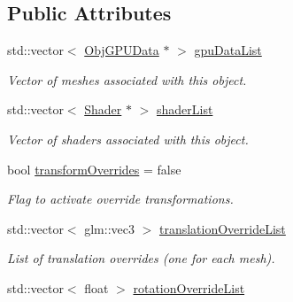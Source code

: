 \subsection*{Public Attributes}
\begin{DoxyCompactItemize}
\item 
std\+::vector$<$ \hyperlink{class_obj_g_p_u_data}{Obj\+G\+P\+U\+Data} $\ast$ $>$ \hyperlink{class_obj_a7de9c5a2918104312df951a5eaf86275}{gpu\+Data\+List}\hypertarget{class_obj_a7de9c5a2918104312df951a5eaf86275}{}\label{class_obj_a7de9c5a2918104312df951a5eaf86275}

\begin{DoxyCompactList}\small\item\em Vector of meshes associated with this object. \end{DoxyCompactList}\item 
std\+::vector$<$ \hyperlink{class_shader}{Shader} $\ast$ $>$ \hyperlink{class_obj_ae7d7eef0d9eeb26a6ec1e2dc0ba524a5}{shader\+List}\hypertarget{class_obj_ae7d7eef0d9eeb26a6ec1e2dc0ba524a5}{}\label{class_obj_ae7d7eef0d9eeb26a6ec1e2dc0ba524a5}

\begin{DoxyCompactList}\small\item\em Vector of shaders associated with this object. \end{DoxyCompactList}\item 
bool \hyperlink{class_obj_a9f1eca3c0db3d8065ce14c040a94273f}{transform\+Overrides} = false\hypertarget{class_obj_a9f1eca3c0db3d8065ce14c040a94273f}{}\label{class_obj_a9f1eca3c0db3d8065ce14c040a94273f}

\begin{DoxyCompactList}\small\item\em Flag to activate override transformations. \end{DoxyCompactList}\item 
std\+::vector$<$ glm\+::vec3 $>$ \hyperlink{class_obj_a10c45b9d87ea8e9aeb47674d519bf712}{translation\+Override\+List}\hypertarget{class_obj_a10c45b9d87ea8e9aeb47674d519bf712}{}\label{class_obj_a10c45b9d87ea8e9aeb47674d519bf712}

\begin{DoxyCompactList}\small\item\em List of translation overrides (one for each mesh). \end{DoxyCompactList}\item 
std\+::vector$<$ float $>$ \hyperlink{class_obj_a34c8ffef2156e8035eaba4696ec090c8}{rotation\+Override\+List}\hypertarget{class_obj_a34c8ffef2156e8035eaba4696ec090c8}{}\label{class_obj_a34c8ffef2156e8035eaba4696ec090c8}


\end{DoxyCompactItemize}
